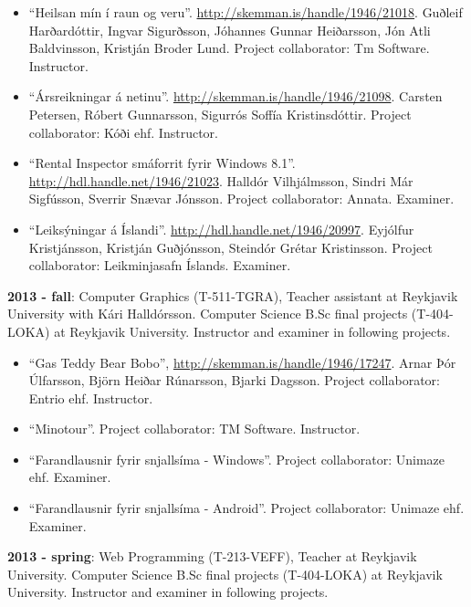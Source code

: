 \begin{itemize}
\item
``Heilsan mín í raun og veru''. \url{http://skemman.is/handle/1946/21018}.
        Guðleif Harðardóttir, Ingvar Sigurðsson, Jóhannes Gunnar Heiðarsson,
        Jón Atli Baldvinsson, Kristján Broder Lund. Project collaborator: Tm
        Software. Instructor.

\item
``Ársreikningar á netinu''. \url{http://skemman.is/handle/1946/21098}. Carsten
        Petersen, Róbert Gunnarsson, Sigurrós Soffía Kristinsdóttir. Project
        collaborator: Kóði ehf. Instructor. 

\item
``Rental Inspector smáforrit fyrir Windows 8.1''.
        \url{http://hdl.handle.net/1946/21023}. Halldór Vilhjálmsson, Sindri
        Már Sigfússon, Sverrir Snævar Jónsson. Project collaborator: Annata.
        Examiner.

\item
``Leiksýningar á Íslandi''. \url{http://hdl.handle.net/1946/20997}. Eyjólfur
        Kristjánsson, Kristján Guðjónsson, Steindór Grétar Kristinsson. Project
        collaborator: Leikminjasafn Íslands. Examiner.
\end{itemize}


\textbf{2013 - fall}: Computer Graphics (T-511-TGRA), Teacher assistant at
Reykjavik University with Kári Halldórsson. Computer Science B.Sc final
projects (T-404-LOKA) at Reykjavik University. Instructor and examiner in
following projects.

\begin{itemize}
\item ``Gas Teddy Bear Bobo'', \url{http://skemman.is/handle/1946/17247}. Arnar
    Þór Úlfarsson, Björn Heiðar Rúnarsson, Bjarki Dagsson. Project
        collaborator: Entrio ehf. Instructor.

\item ``Minotour''. Project collaborator: TM Software. Instructor.

\item ``Farandlausnir fyrir snjallsíma - Windows''. Project collaborator:
    Unimaze ehf. Examiner.

\item ``Farandlausnir fyrir snjallsíma - Android''. Project collaborator:
    Unimaze ehf. Examiner.
\end{itemize}


\textbf{2013 - spring}: Web Programming (T-213-VEFF), Teacher at Reykjavik
University. Computer Science B.Sc final projects (T-404-LOKA) at Reykjavik
University. Instructor and examiner in following projects.

